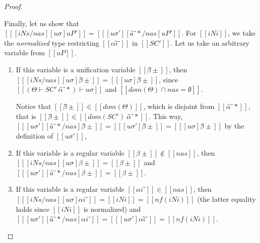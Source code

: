 \begin{proof}
\begin{caseof}
        Finally, let us show that $[[ [iNs/nas][uσ]uP' ]] = [[ [uσ'][â⁻*/nas]uP' ]]$.
        For $[[iNi]]$, we take the \emph{normalized} type restricting $[[αî⁻]]$ in $[[SC']]$.
        Let us take an arbitrary variable from $[[uP]]$.
        \begin{enumerate}
            \item If this variable is a unification variable $[[β̂±]]$, then
                $[[ [iNs/nas][uσ] β̂± ]] = [[ [uσ]β̂± ]] $, since $[[(Θ  ⊢  SC' \ {α̂⁻*}) ⊢ uσ]]$ and 
                $[[ dom(Θ) ∩ {nas} = ∅ ]]$. 

                Notice that $[[β̂±]] \in [[dom(Θ)]]$, which is disjoint from $[[{α̂⁻*}]]$, 
                that is $[[β̂±]] \in [[dom(SC') \ {α̂⁻*}]]$. This way,
                $[[ [uσ'][â⁻*/nas]β̂± ]] = [[  [uσ']β̂± ]] = [[ [uσ]β̂± ]]$ by the definition 
                of $[[uσ']]$,
            \item If this variable is a regular variable $[[β±]] \notin [[nas]]$, then 
                $[[ [iNs/nas][uσ] β± ]] = [[ β± ]] $ and $[[ [uσ'][â⁻*/nas]β± ]] = [[ β± ]]$. 
            \item If this variable is a regular variable $[[αi⁻]] \in [[nas]]$, then 
                $[[ [iNs/nas][uσ] αi⁻ ]] = [[ iNi ]] = [[ nf(iNi) ]]$
                (the latter equality holds since $[[iNi]]$ is normalized)
                and $[[ [uσ'][â⁻*/nas]αi⁻ ]] = [[  [uσ']αî⁻ ]] = [[ nf(iNi) ]]$.
        \end{enumerate}
    \end{caseof}
\end{proof}

